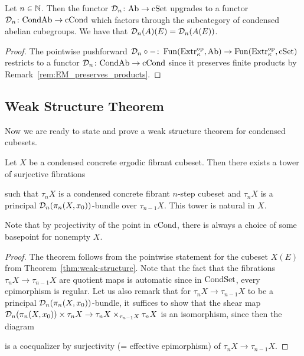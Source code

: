 \begin{proposition}
Let $n\in{\mathbb{N}}$.
Then the functor $\mathcal{D}_n\colon\mathrm{Ab}\to\mathrm{cSet}$ upgrades to a functor $\mathcal{D}_n\colon\mathrm{CondAb}\to\mathrm{cCond}$
which factors through the subcategory of condensed abelian cubegroups.
We have that $\mathcal{D}_n(A)(E) = \mathcal{D}_n(A(E))$.
\end{proposition}

\begin{proof}
The pointwise pushforward $\mathcal{D}_n\circ -\colon\operatorname{Fun}(\mathrm{Extr}_\kappa^{\mathrm{op}},\mathrm{Ab})\to\operatorname{Fun}(\mathrm{Extr}_\kappa^{\mathrm{op}},\mathrm{cSet})$
restricts to a functor $\mathcal{D}_n\colon\mathrm{CondAb}\to\mathrm{cCond}$ since it preserves finite products by Remark~\ref{rem:EM_preserves_products}.
\end{proof}


\subsection{Weak Structure Theorem}

Now we are ready to state and prove a weak structure theorem for condensed cubesets.

\begin{theorem}\label{thm:cond-weak-structure}
Let $X$ be a condensed concrete ergodic fibrant cubeset.
Then there exists a tower of surjective fibrations
\begin{center}
\end{center}
such that $\tau_n X$ is a condensed concrete fibrant $n$-step cubeset
and $\tau_n X$ is a principal $\mathcal{D}_n(\pi_n(X,x_0))$-bundle over $\tau_{n-1} X$.
This tower is natural in $X$.
\end{theorem}

Note that by projectivity of the point in $\mathrm{cCond}$, there is always a choice of some basepoint for nonempty $X$.

\begin{proof}
The theorem follows from the pointwise statement for the cubeset $X(E)$ from Theorem~\ref{thm:weak-structure}.
Note that the fact that the fibrations $\tau_n X\to\tau_{n-1} X$ are quotient maps
is automatic since in $\mathrm{CondSet}$, every epimorphism is regular.
Let us also remark that for $\tau_n X\to\tau_{n-1} X$ to be a principal $\mathcal{D}_n(\pi_n(X,x_0))$-bundle,
it suffices to show that the shear map $\mathcal{D}_n(\pi_n(X,x_0))\times\tau_n X\to\tau_n X\times_{\tau_{n-1}X}\tau_n X$ is an isomorphism,
since then the diagram
\begin{center}
\end{center}
is a coequalizer by surjectivity (= effective epimorphism) of $\tau_nX\to\tau_{n-1}X$.
\end{proof}

